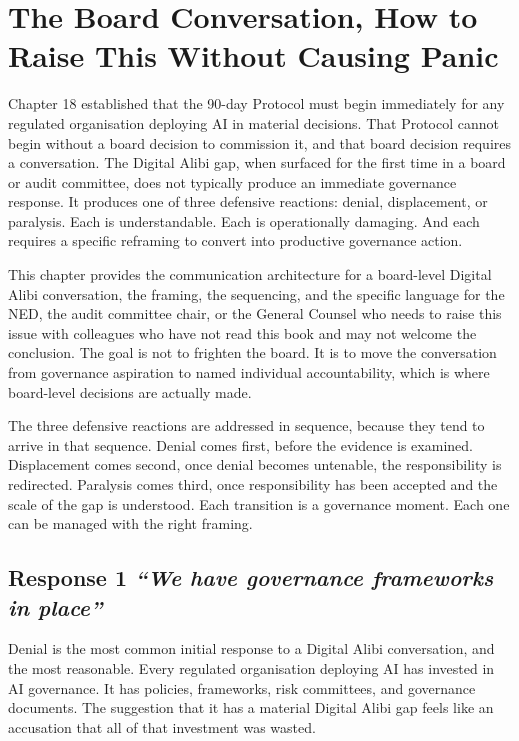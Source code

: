 
\chapter{The Board Conversation, How to Raise This Without Causing Panic}

Chapter 18 established that the 90-day Protocol must begin immediately for any regulated organisation deploying AI in material decisions. That Protocol cannot begin without a board decision to commission it, and that board decision requires a conversation. The Digital Alibi gap, when surfaced for the first time in a board or audit committee, does not typically produce an immediate governance response. It produces one of three defensive reactions: denial, displacement, or paralysis. Each is understandable. Each is operationally damaging. And each requires a specific reframing to convert into productive governance action.

This chapter provides the communication architecture for a board-level Digital Alibi conversation, the framing, the sequencing, and the specific language for the NED, the audit committee chair, or the General Counsel who needs to raise this issue with colleagues who have not read this book and may not welcome the conclusion. The goal is not to frighten the board. It is to move the conversation from governance aspiration to named individual accountability, which is where board-level decisions are actually made.

The three defensive reactions are addressed in sequence, because they tend to arrive in that sequence. Denial comes first, before the evidence is examined. Displacement comes second, once denial becomes untenable, the responsibility is redirected. Paralysis comes third, once responsibility has been accepted and the scale of the gap is understood. Each transition is a governance moment. Each one can be managed with the right framing.

\scenebreak

\section{\texorpdfstring{Response 1 \emph{``We have governance frameworks in place''}}{Response 1 ``We have governance frameworks in place''}}

Denial is the most common initial response to a Digital Alibi conversation, and the most reasonable. Every regulated organisation deploying AI has invested in AI governance. It has policies, frameworks, risk committees, and governance documents. The suggestion that it has a material Digital Alibi gap feels like an accusation that all of that investment was wasted.

